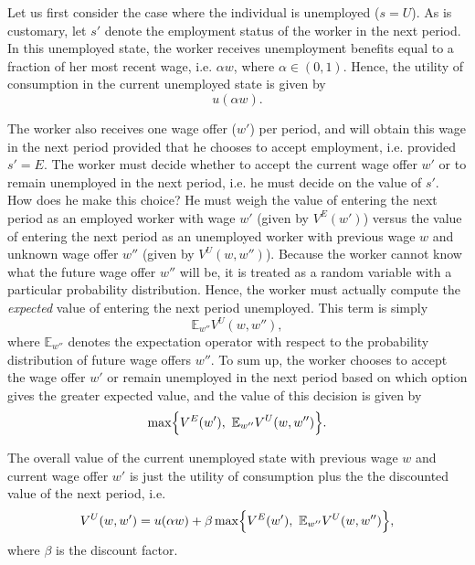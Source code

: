 Let us first consider the case where the individual is unemployed ($s = U$). As is customary, let $s'$ denote the
employment status of the worker in the next period.
In this unemployed state, the worker receives unemployment benefits equal to a fraction of her most recent wage,
i.e. $\alpha w$, where $\alpha \in (0, 1)$.
Hence, the utility of consumption in the current unemployed state is given by
\[
u(\alpha w).
\]

The worker also receives one wage offer ($w'$) per period, and will obtain
this wage in the next period provided that he chooses to accept employment, i.e. provided $s' = E$.
The worker must decide whether to accept the current wage offer $w'$ or to remain unemployed in the next period,
i.e. he must decide on the value of $s'$. How
does he make this choice? He must weigh the value of entering the next period as an employed worker with wage
$w'$ (given by $V^E(w')$) versus the value of entering the next period as an unemployed worker with
previous wage $w$ and unknown wage offer $w''$ (given by $V^U(w,w'')$). Because the worker cannot know
what the future wage offer $w''$ will be, it is treated as a random variable with a particular probability
distribution. Hence, the worker must actually compute the \emph{expected} value of entering the next
period unemployed. This term is simply
\[
\mathbb{E}_{w''}V^U(w,w''),
\]
where $\mathbb{E}_{w''}$ denotes the expectation operator with respect to the probability distribution of future
wage offers $w''$.
To sum up, the worker chooses to accept the wage offer $w'$ or remain unemployed in the next period based on
which option gives the greater expected value, and the value of this decision is given by
\[
\max\Bigl\{V^E(w'), \,\, \mathbb{E}_{w''}V^U(w,w'')\Bigr\}.
\]

The overall value of the current unemployed state with previous wage $w$ and current wage offer $w'$ is
just the utility of consumption plus the the discounted value of the next period, i.e.
\begin{equation}\label{EqVu}
V^U(w,w') = u(\alpha w) + \beta \max\Bigl\{V^E(w'), \,\, \mathbb{E}_{w''}V^U(w,w'')\Bigr\},
\end{equation}
where $\beta$ is the discount factor.

